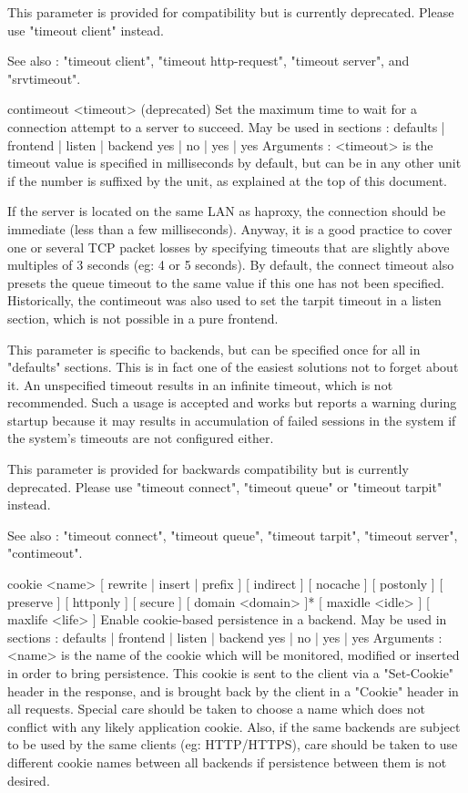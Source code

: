   This parameter is provided for compatibility but is currently deprecated.
  Please use "timeout client" instead.

  See also : "timeout client", "timeout http-request", "timeout server", and
             "srvtimeout".


contimeout <timeout> (deprecated)
  Set the maximum time to wait for a connection attempt to a server to succeed.
  May be used in sections :   defaults | frontend | listen | backend
                                 yes   |    no    |   yes  |   yes
  Arguments :
    <timeout> is the timeout value is specified in milliseconds by default, but
              can be in any other unit if the number is suffixed by the unit,
              as explained at the top of this document.

  If the server is located on the same LAN as haproxy, the connection should be
  immediate (less than a few milliseconds). Anyway, it is a good practice to
  cover one or several TCP packet losses by specifying timeouts that are
  slightly above multiples of 3 seconds (eg: 4 or 5 seconds). By default, the
  connect timeout also presets the queue timeout to the same value if this one
  has not been specified. Historically, the contimeout was also used to set the
  tarpit timeout in a listen section, which is not possible in a pure frontend.

  This parameter is specific to backends, but can be specified once for all in
  "defaults" sections. This is in fact one of the easiest solutions not to
  forget about it. An unspecified timeout results in an infinite timeout, which
  is not recommended. Such a usage is accepted and works but reports a warning
  during startup because it may results in accumulation of failed sessions in
  the system if the system's timeouts are not configured either.

  This parameter is provided for backwards compatibility but is currently
  deprecated. Please use "timeout connect", "timeout queue" or "timeout tarpit"
  instead.

  See also : "timeout connect", "timeout queue", "timeout tarpit",
             "timeout server", "contimeout".


cookie <name> [ rewrite | insert | prefix ] [ indirect ] [ nocache ]
              [ postonly ] [ preserve ] [ httponly ] [ secure ]
              [ domain <domain> ]* [ maxidle <idle> ] [ maxlife <life> ]
  Enable cookie-based persistence in a backend.
  May be used in sections :   defaults | frontend | listen | backend
                                 yes   |    no    |   yes  |   yes
  Arguments :
    <name>    is the name of the cookie which will be monitored, modified or
              inserted in order to bring persistence. This cookie is sent to
              the client via a "Set-Cookie" header in the response, and is
              brought back by the client in a "Cookie" header in all requests.
              Special care should be taken to choose a name which does not
              conflict with any likely application cookie. Also, if the same
              backends are subject to be used by the same clients (eg:
              HTTP/HTTPS), care should be taken to use different cookie names
              between all backends if persistence between them is not desired.

